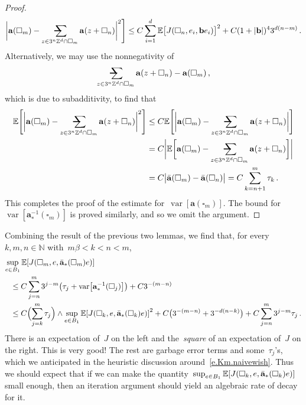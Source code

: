 \documentclass[11pt,twoside]{article} %
\makeatletter
\let\oldsquare\square %
\renewcommand{\square}{\oldsquare}
\numberwithin{equation}{section}
\theoremstyle{definition}
\let\originalleft\left
\let\originalright\right
\renewcommand{\left}{\mathopen{}\mathclose\bgroup\originalleft}
\renewcommand{\right}{\aftergroup\egroup\originalright}
\newcommand*{\N}{\ensuremath{\mathbb{N}}}
\newcommand*{\Zd}{\ensuremath{\mathbb{Z}^d}}
\renewcommand{\b}{\ensuremath{\mathbf{b}}}
\renewcommand{\a}{\mathbf{a}}
\newcommand{\ahom}{\bar{\a}}
\newcommand{\cu}{\square}
\newcommand{\E}{\mathbb{E}}
\DeclareMathOperator{\var}{var}
\newcommand{\avsum}{\mathop{\mathpalette\avsuminner\relax}\displaylimits}
\newcommand\avsuminner[2]{%
  {\sbox0{$\m@th#1\sum$}%
   \vphantom{\usebox0}%
   \ooalign{%
     \hidewidth
     \smash{\,\rule[.23em]{8.8pt}{1.1pt} \relax}%
     \hidewidth\cr
   ~$\m@th#1\sum$\cr
   }%
  }%
}
\makeatother
\begin{document}
\begin{proof}
\begin{equation}
\biggl| \a(\cu_m) - \avsum_{z\in 3^n\Zd\cap\cu_m}
\a(z+\cu_n) \biggr|^2
\Biggr]
\leq
C \sum_{i=1}^d\E \bigl[ J(\cu_n,e_i,\b e_i) \bigr]^2 + C(1+|\b|)^4 3^{d(n-m)}
\,.
\end{equation}
Alternatively, we may use the nonnegativity of
\begin{equation*}
\avsum_{z\in 3^n\Zd\cap\cu_m}
\a(z+\cu_n)
-
\a(\cu_m)\,,
\end{equation*}
which is due to subadditivity, to find that 
\begin{align}
\label{e.alternatively.tauk}
\E \Biggl[
\biggl| \a(\cu_m) - \avsum_{z\in 3^n\Zd\cap\cu_m} 
\a(z+\cu_n) \biggr|^2
\Biggr]
&
\leq
C\E \Biggl[
\biggl| \a(\cu_m) - \avsum_{z\in 3^n\Zd\cap\cu_m} 
\a(z+\cu_n) \biggr|
\Biggr]
\notag \\ & 
=
C\biggl|  \E \biggl[
\a(\cu_m) - \avsum_{z\in 3^n\Zd\cap\cu_m} 
\a(z+\cu_n) 
\biggr]\biggr|
\notag \\ & 
=
C \bigl| \ahom(\cu_m) - \ahom(\cu_n) \bigr|
=
C \sum_{k=n+1}^m \tau_k
\,.
\end{align}
This completes the proof of the estimate for~$\var[ \a(\cu_m)]$. The bound for~$\var[ \a_*^{-1}(\cu_m)]$ is proved similarly, and so we omit the argument. 
\end{proof}



Combining the result of the previous two lemmas, we find that, for every~$k,m,n\in\N$ with~$m\beta < k < n< m$,
\begin{align}
\label{e.combo}
\lefteqn{
\sup_{e\in B_1}
\E \left[ J(\cu_m,e,\ahom_*(\cu_m)e) \right]
} \ \ & 
\notag \\ &
\leq 
C 
\sum_{j=n}^{m} 3^{j-m} 
\left( \tau_j + \var\left[ \a_*^{-1}(\cu_j) \right] \right)
+C 3^{-(m-n)}
\notag \\ & 
\leq 
C
\Bigl( \sum_{j=k}^m \tau_j  \Bigr)\wedge 
\sup_{e\in B_1 }
\E \left[ J(\cu_k,e,\ahom_*(\cu_k) e) \right]^2
+
C 
\bigl( 3^{-(m-n)} + 3^{-d(n-k)} \bigr)
+
C\sum_{j=n}^m 3^{j-m} \tau_j
\,.
\end{align}
There is an expectation of~$J$ on the left and the~\emph{square} of an expectation of~$J$ on the right. This is very good! The rest are garbage error terms and some~$\tau_j$'s, which we anticipated in the heuristic discussion around~\eqref{e.Km.naivewish}. 
Thus we should expect that if we can make the quantity~$\sup_{e\in B_1 }
\E \left[ J(\cu_k,e,\ahom_*(\cu_k) e) \right]$ small enough, then an iteration argument should yield an algebraic rate of decay for it. 
\end{document}
